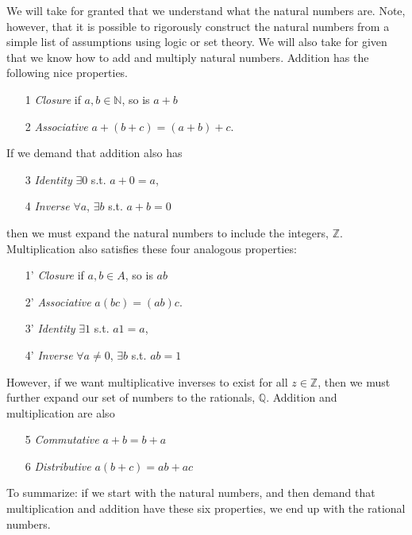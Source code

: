 We will take for granted that we understand what the natural numbers
are. Note, however, that it is possible to rigorously construct the
natural numbers from a simple list of assumptions using logic or set
theory. We will also take for given that we know how to add and
multiply natural numbers. Addition has the following nice properties.
\begin{itemize}
\item[1] \emph{Closure} if $a, b \in \mathbb{N}$, so is $a + b$ 
\item[2] \emph{Associative} $a + (b + c) = (a + b) + c$. 
\end{itemize}
If we demand that addition also has 
\begin{itemize}
\item[3] \emph{Identity} $\exists 0$ s.t. $a + 0 = a$,
\item[4] \emph{Inverse} $\forall a$, $\exists b$ s.t. $a + b = 0$
\end{itemize}
then we must expand the natural numbers to include the integers,
$\mathbb{Z}$. Multiplication also satisfies these four analogous
properties:
\begin{itemize}
\item[1'] \emph{Closure} if $a, b \in A$, so is $ab$ 
\item[2'] \emph{Associative} $a (b c) = (a b)  c$. 
\item[3'] \emph{Identity} $\exists 1$ s.t. $a 1= a$,
\item[4'] \emph{Inverse} $\forall a \neq 0$, $\exists b$ s.t. $ab = 1$
\end{itemize}
However, if we want multiplicative inverses to exist for all $z\in
\mathbb{Z}$, then we must further expand our set of numbers to the
rationals, $\mathbb{Q}$. Addition and multiplication are also
\begin{itemize}
\item[5] \emph{Commutative} $ a + b = b + a$
\item[6] \emph{Distributive} $a (b + c) = ab + ac$
\end{itemize}
To summarize: if we start with the natural numbers, and then demand
that multiplication and addition have these six properties, we end up
with the rational numbers. 

